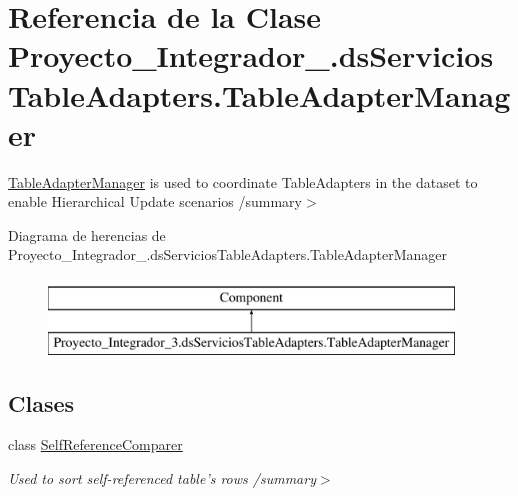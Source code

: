 \hypertarget{class_proyecto___integrador__3_1_1ds_servicios_table_adapters_1_1_table_adapter_manager}{\section{Referencia de la Clase Proyecto\-\_\-\-Integrador\-\_.\-ds\-Servicios\-Table\-Adapters.\-Table\-Adapter\-Manager}
\label{class_proyecto___integrador__3_1_1ds_servicios_table_adapters_1_1_table_adapter_manager}
}


\hyperlink{class_proyecto___integrador__3_1_1ds_servicios_table_adapters_1_1_table_adapter_manager}{Table\-Adapter\-Manager} is used to coordinate Table\-Adapters in the dataset to enable Hierarchical Update scenarios /summary$>$  


Diagrama de herencias de Proyecto\-\_\-\-Integrador\-\_.\-ds\-Servicios\-Table\-Adapters.\-Table\-Adapter\-Manager\begin{figure}[H]
\begin{center}
\leavevmode
\includegraphics[height=2.000000cm]{d9/dfb/class_proyecto___integrador__3_1_1ds_servicios_table_adapters_1_1_table_adapter_manager}
\end{center}
\end{figure}
\subsection*{Clases}
\begin{DoxyCompactItemize}
\item 
class \hyperlink{class_proyecto___integrador__3_1_1ds_servicios_table_adapters_1_1_table_adapter_manager_1_1_self_reference_comparer}{Self\-Reference\-Comparer}
\begin{DoxyCompactList}\small\item\em Used to sort self-\/referenced table's rows /summary$>$ \end{DoxyCompactList}\end{DoxyCompactItemize}
